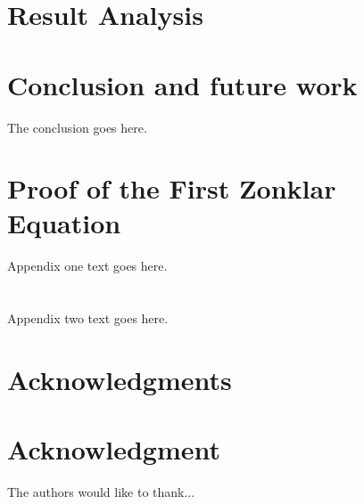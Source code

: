 \documentclass[12pt,journal,compsoc]{IEEEtran}
\begin{document}
\section{Result Analysis}


\section{Conclusion and future work}
The conclusion goes here.

\appendices
\section{Proof of the First Zonklar Equation}
Appendix one text goes here.

\section{}
Appendix two text goes here.


\ifCLASSOPTIONcompsoc
  \section*{Acknowledgments}
\else
  \section*{Acknowledgment}
\fi
The authors would like to thank...


\ifCLASSOPTIONcaptionsoff
  \newpage
\fi

\end{document}
